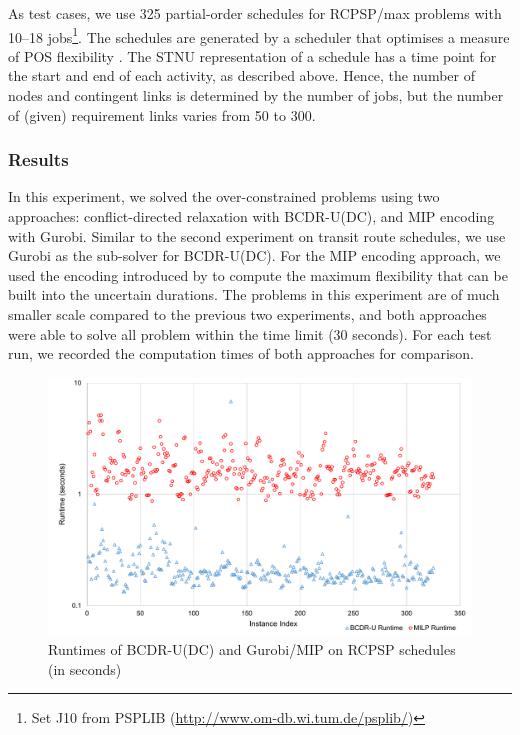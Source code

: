 \documentclass[jair,twoside,11pt,theapa]{article}
\begin{document}
As test cases, we use 325 partial-order schedules for RCPSP/max problems
\cite{kolisch-padman97} with 10--18 jobs\footnote{Set J10 from PSPLIB
(\url{http://www.om-db.wi.tum.de/psplib/})}. The schedules are generated by a
scheduler that optimises a measure of POS flexibility
\cite{banerjee-haslum:icaps11}. The STNU representation of a schedule has a time
point for the start and end of each activity, as described above. Hence, the
number of nodes and contingent links is determined by the number of jobs, but
the number of (given) requirement links varies from 50 to 300.



\subsubsection{Results}


In this experiment, we solved the over-constrained problems using two
approaches: conflict-directed relaxation with BCDR-U(DC), and MIP encoding with
Gurobi. Similar to the second experiment on transit route schedules, we use
Gurobi as the sub-solver for BCDR-U(DC). For the MIP encoding approach, we used the
encoding introduced by  to compute the maximum
flexibility that can be built into the uncertain durations. The problems in this
experiment are of much smaller scale compared to the previous two experiments,
and both approaches were able to solve all problem within the time limit (30
seconds). For each test run, we recorded the computation times of both approaches for comparison.


\begin{figure}[htb]
	\centering
	\includegraphics[width=1.0\textwidth]{figures/results/rcpsp_runtime.pdf}
	\caption{Runtimes of BCDR-U(DC) and Gurobi/MIP on RCPSP schedules (in seconds)}
	\label{fig:rcpsp_results}
\end{figure}
\end{document}
